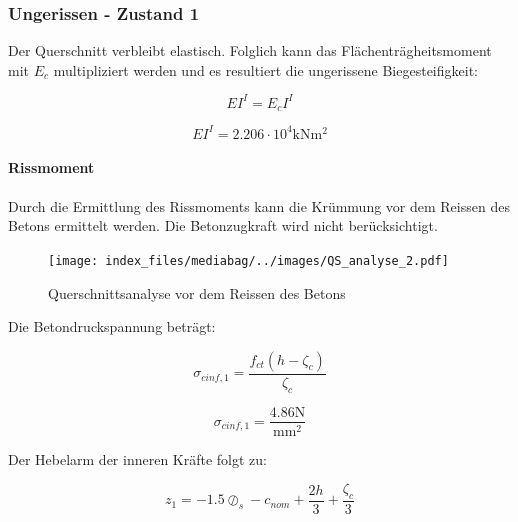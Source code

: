 \documentclass[
  letterpaper,
]{scrreprt}
\let\oldparagraph\paragraph
\renewcommand{\paragraph}[1]{\oldparagraph{#1}\mbox{}}
\begin{document}
\hypertarget{ungerissen---zustand-1}{%
\subsubsection{Ungerissen - Zustand 1}\label{ungerissen---zustand-1}}

Der Querschnitt verbleibt elastisch. Folglich kann das
Flächenträgheitsmoment mit \(E_c\) multipliziert werden und es
resultiert die ungerissene Biegesteifigkeit:

\begin{equation}EI^{I} = E_{c} I^{I}\end{equation}

\begin{equation}EI^{I} = 2.206 \cdot 10^{4} \text{kN} \text{m}^{2}\end{equation}

\hypertarget{rissmoment}{%
\paragraph{Rissmoment}\label{rissmoment}}

Durch die Ermittlung des Rissmoments kann die Krümmung vor dem Reissen
des Betons ermittelt werden. Die Betonzugkraft wird nicht
berücksichtigt.

\begin{figure}[H]

{\centering \texttt{[image: index\_files/mediabag/../images/QS\_analyse\_2.pdf]}

}

\caption{\label{fig-qs2}Querschnittsanalyse vor dem Reissen des Betons}

\end{figure}

Die Betondruckspannung beträgt:

\begin{equation}\sigma_{c inf,1} = \frac{f_{ct} \left(h - \zeta_{c}\right)}{\zeta_{c}}\end{equation}

\begin{equation}\sigma_{c inf,1} = \frac{4.86 \text{N}}{\text{mm}^{2}}\end{equation}

Der Hebelarm der inneren Kräfte folgt zu:

\begin{equation}z_{1} = - 1.5 \oslash_{s} - c_{nom} + \frac{2 h}{3} + \frac{\zeta_{c}}{3}\end{equation}
\end{document}
